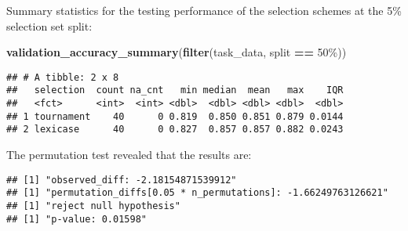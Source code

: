 \documentclass[
]{book}
\newenvironment{Shaded}{\begin{snugshade}}{\end{snugshade}}
\newcommand{\AttributeTok}[1]{\textcolor[rgb]{0.13,0.29,0.53}{#1}}
\newcommand{\DecValTok}[1]{\textcolor[rgb]{0.00,0.00,0.81}{#1}}
\newcommand{\FunctionTok}[1]{\textcolor[rgb]{0.13,0.29,0.53}{\textbf{#1}}}
\newcommand{\NormalTok}[1]{#1}
\newcommand{\OtherTok}[1]{\textcolor[rgb]{0.56,0.35,0.01}{#1}}
\newcommand{\SpecialCharTok}[1]{\textcolor[rgb]{0.81,0.36,0.00}{\textbf{#1}}}
\newcommand{\StringTok}[1]{\textcolor[rgb]{0.31,0.60,0.02}{#1}}
\begin{document}
Summary statistics for the testing performance of the selection schemes at the 5\% selection set split:

\begin{Shaded}
\begin{Highlighting}[]
\FunctionTok{validation\_accuracy\_summary}\NormalTok{(}\FunctionTok{filter}\NormalTok{(task\_data, split }\SpecialCharTok{==} \StringTok{\textquotesingle{}50\%\textquotesingle{}}\NormalTok{))}
\end{Highlighting}
\end{Shaded}

\begin{verbatim}
## # A tibble: 2 x 8
##   selection  count na_cnt   min median  mean   max    IQR
##   <fct>      <int>  <int> <dbl>  <dbl> <dbl> <dbl>  <dbl>
## 1 tournament    40      0 0.819  0.850 0.851 0.879 0.0144
## 2 lexicase      40      0 0.827  0.857 0.857 0.882 0.0243
\end{verbatim}

The permutation test revealed that the results are:

\begin{Shaded}
\end{Shaded}

\begin{verbatim}
## [1] "observed_diff: -2.18154871539912"
## [1] "permutation_diffs[0.05 * n_permutations]: -1.66249763126621"
## [1] "reject null hypothesis"
## [1] "p-value: 0.01598"
\end{verbatim}
\end{document}
